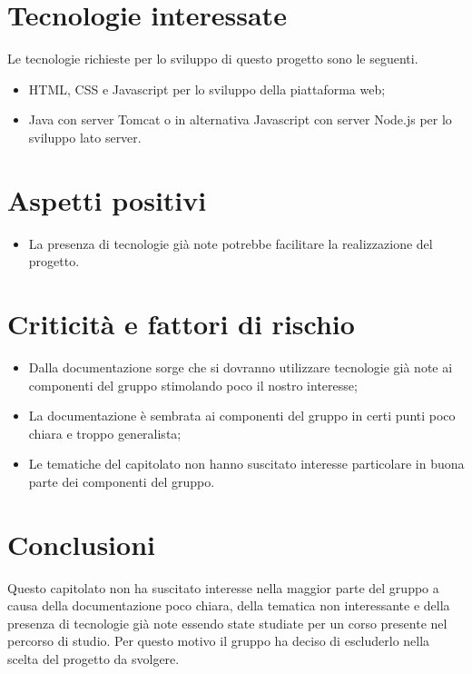 \section{Tecnologie interessate}
Le tecnologie richieste per lo sviluppo di questo progetto sono le seguenti.
\begin{itemize}
	\item HTML, CSS e Javascript per lo sviluppo della piattaforma web;
	\item Java con server Tomcat o in alternativa Javascript con server Node.js per lo sviluppo lato server.
\end{itemize}
\section{Aspetti positivi}
\begin{itemize}
	\item La presenza di tecnologie già note potrebbe facilitare la realizzazione del progetto.
\end{itemize}
\section{Criticità e fattori di rischio}
\begin{itemize}
	\item Dalla documentazione sorge che si dovranno utilizzare tecnologie già note ai componenti del gruppo stimolando poco il nostro interesse;
	\item La documentazione è sembrata ai componenti del gruppo in certi punti poco chiara e troppo generalista;
	\item Le tematiche del capitolato non hanno suscitato interesse particolare in buona parte dei componenti del gruppo.
\end{itemize}
\section{Conclusioni}
Questo capitolato non ha suscitato interesse nella maggior parte del gruppo a causa della documentazione poco chiara, della tematica non interessante e della presenza di tecnologie già note essendo state studiate per un corso presente nel percorso di studio. Per questo motivo il gruppo ha deciso di escluderlo nella scelta del progetto da svolgere.